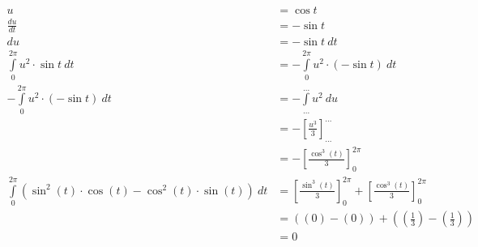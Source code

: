 \documentclass[12pt]{article}
\begin{document}
\begin{enumerate}[start=1,label={\bfseries Frage \arabic*:},leftmargin=1in]
\begin{align*}
        u &= \cos{t} \\
        \frac{du}{dt} &= -\sin{t} \\
        du &= -\sin{t} \: dt \\
        \int\limits_0^{2\pi} u^2 \cdot \sin{t} \: dt &= - \int\limits_0^{2\pi} u^2 \cdot (-\sin{t}) \: dt \\
        - \int\limits_0^{2\pi} u^2 \cdot (-\sin{t}) \: dt &= - \int\limits_{...}^{...} u^2 \: du \\
        &= - \left[\frac{u^3}{3}\right]_{...}^{...} \\
        &= - \left[\frac{\cos^3{(t)}}{3}\right]_{0}^{2\pi} \\
        \int\limits_0^{2\pi} (\sin^2{(t)} \cdot \cos{(t)} - \cos^2{(t)} \cdot \sin{(t)}) \: dt &= \left[\frac{\sin^3{(t)}}{3}\right]_0^{2\pi} + \left[\frac{\cos^3{(t)}}{3}\right]_0^{2\pi} \\
        &= \left(\left(0\right) - \left(0\right)\right) + \left(\left(\frac{1}{3}\right) - \left(\frac{1}{3}\right)\right) \\
        &= 0
    \end{align*}

    \enlargethispage{-\baselineskip}
    \enlargethispage{-\baselineskip}
    \enlargethispage{-\baselineskip}
    \enlargethispage{-\baselineskip}
    \enlargethispage{-\baselineskip}
    \enlargethispage{-\baselineskip}
    \enlargethispage{-\baselineskip}
    \enlargethispage{-\baselineskip}
    \enlargethispage{-\baselineskip}
    \enlargethispage{-\baselineskip}
    \enlargethispage{-\baselineskip}
    \enlargethispage{-\baselineskip}
    \enlargethispage{-\baselineskip}
    \enlargethispage{-\baselineskip}
    \enlargethispage{-\baselineskip}
    \enlargethispage{-\baselineskip}
    \enlargethispage{-\baselineskip}
    

\end{enumerate}
\end{document}
